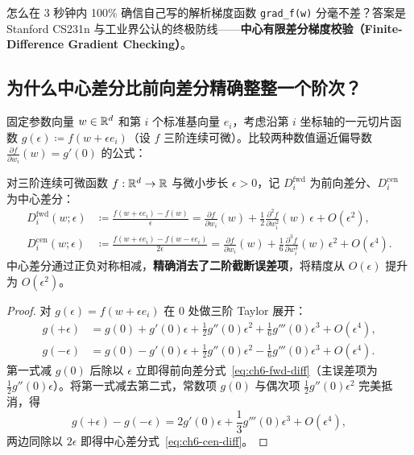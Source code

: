 怎么在 3 秒钟内 100\% 确信自己写的解析梯度函数 \texttt{grad\_f(w)} 分毫不差？答案是 Stanford CS231n 与工业界公认的终极防线——\textbf{中心有限差分梯度校验（Finite-Difference Gradient Checking）}。

\subsection{为什么中心差分比前向差分精确整整一个阶次？}

固定参数向量 $w\in\mathbb{R}^d$ 和第 $i$ 个标准基向量 $e_i$，考虑沿第 $i$ 坐标轴的一元切片函数 $g(\epsilon) \coloneqq f(w + \epsilon e_i)$（设 $f$ 三阶连续可微）。比较两种数值逼近偏导数 $\frac{\partial f}{\partial w_i}(w) = g'(0)$ 的公式：

\begin{thmBox}
\begin{proposition}\label{prop:ch6-fd-order}
对三阶连续可微函数 $f:\mathbb{R}^d\to\mathbb{R}$ 与微小步长 $\epsilon > 0$，记 $D_i^{\text{fwd}}$ 为前向差分、$D_i^{\text{cen}}$ 为中心差分：
\begin{align}
  D_i^{\text{fwd}}(w;\epsilon) &\coloneqq \frac{f(w + \epsilon e_i) - f(w)}{\epsilon}
    = \frac{\partial f}{\partial w_i}(w) + \frac{1}{2}\frac{\partial^2 f}{\partial w_i^2}(w)\,\epsilon + O(\epsilon^2), \label{eq:ch6-fwd-diff}\\
  D_i^{\text{cen}}(w;\epsilon) &\coloneqq \frac{f(w + \epsilon e_i) - f(w - \epsilon e_i)}{2\epsilon}
    = \frac{\partial f}{\partial w_i}(w) + \frac{1}{6}\frac{\partial^3 f}{\partial w_i^3}(w)\,\epsilon^2 + O(\epsilon^4). \label{eq:ch6-cen-diff}
\end{align}
中心差分通过正负对称相减，\textbf{精确消去了二阶截断误差项}，将精度从 $O(\epsilon)$ 提升为 $O(\epsilon^2)$。
\end{proposition}
\end{thmBox}

\begin{proof}
对 $g(\epsilon) = f(w+\epsilon e_i)$ 在 $0$ 处做三阶 Taylor 展开：
\begin{align*}
  g(+\epsilon) &= g(0) + g'(0)\epsilon + \frac{1}{2}g''(0)\epsilon^2 + \frac{1}{6}g'''(0)\epsilon^3 + O(\epsilon^4), \\
  g(-\epsilon) &= g(0) - g'(0)\epsilon + \frac{1}{2}g''(0)\epsilon^2 - \frac{1}{6}g'''(0)\epsilon^3 + O(\epsilon^4).
\end{align*}
第一式减 $g(0)$ 后除以 $\epsilon$ 立即得前向差分式~\eqref{eq:ch6-fwd-diff}（主误差项为 $\frac{1}{2}g''(0)\epsilon$）。将第一式减去第二式，常数项 $g(0)$ 与偶次项 $\frac{1}{2}g''(0)\epsilon^2$ 完美抵消，得
\[
  g(+\epsilon) - g(-\epsilon) = 2 g'(0)\epsilon + \frac{1}{3}g'''(0)\epsilon^3 + O(\epsilon^4),
\]
两边同除以 $2\epsilon$ 即得中心差分式~\eqref{eq:ch6-cen-diff}。
\end{proof}

